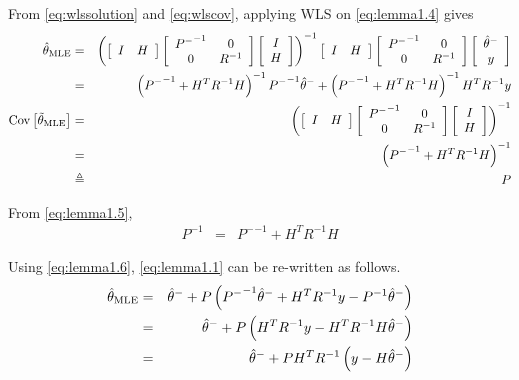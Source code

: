 \begin{lemma}
	From \eqref{eq:wlssolution} and \eqref{eq:wlscov}, applying WLS on \eqref{eq:lemma1.4} gives
	\begin{eqnarray}
		\hat{\theta}_{\textup{MLE}} &=& \left(\left[\begin{array}{cc}
			I & H 
		\end{array}\right]\left[\begin{array}{cc}
			{P^-}^{-1} & 0 \\ 0 & R^{-1}
		\end{array}\right]\left[\begin{array}{c}
			I \\ H
		\end{array}\right]\right)^{-1}\left[\begin{array}{cc}
			I & H 
		\end{array}\right]\left[\begin{array}{cc}
			{P^-}^{-1} & 0 \\ 0 & R^{-1}
		\end{array}\right]\left[\begin{array}{c}
			\hat{\theta}^- \\ y
		\end{array}\right] \nonumber \\
		&=&\left({P^-}^{-1}+H^TR^{-1}H\right)^{-1}{P^-}^{-1}\hat{\theta}^- + \left({P^-}^{-1}+H^TR^{-1}H\right)^{-1}H^TR^{-1}y \label{eq:lemma1.8} \\
		\textup{Cov}\left[\tilde{\theta}_{\textup{MLE}}\right] &=& \left(\left[\begin{array}{cc}
			I & H 
		\end{array}\right]\left[\begin{array}{cc}
			{P^-}^{-1} & 0 \\ 0 & R^{-1}
		\end{array}\right]\left[\begin{array}{c}
			I \\ H
		\end{array}\right]\right)^{-1} \nonumber \\
		&=& \left({P^-}^{-1}+H^TR^{-1}H\right)^{-1} \label{eq:lemma1.5a} \\
		&\triangleq& P \label{eq:lemma1.5}
	\end{eqnarray}
	
	From \eqref{eq:lemma1.5},
	\begin{eqnarray}
		P^{-1} &=& {P^-}^{-1}+H^TR^{-1}H \label{eq:lemma1.6}
	\end{eqnarray}
	
	Using \eqref{eq:lemma1.6}, \eqref{eq:lemma1.1} can be re-written as follows.
	\begin{eqnarray}
		\hat{\theta}_{\textup{MLE}} &=& \hat{\theta}^- + P\left({P^-}^{-1}\hat{\theta}^- + H^TR^{-1}y - P^{-1}\hat{\theta}^-\right) \nonumber \\
		&=& \hat{\theta}^- + P\left(H^TR^{-1}y - H^TR^{-1}H\hat{\theta}^-\right) \nonumber \\
		&=& \hat{\theta}^- + PH^TR^{-1}\left(y - H\hat{\theta}^-\right) \label{eq:lemma1.7}
	\end{eqnarray}
	

\end{lemma}
